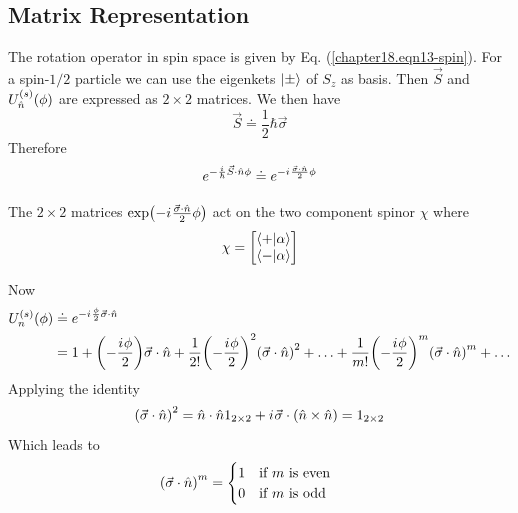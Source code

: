 \subsection{Matrix Representation}
The rotation operator in spin space is given by Eq. (\ref{chapter18.eqn13-spin}). For a spin-$1/2$ particle we can use the eigenkets $\ket{\pm}$ of $S_z$ as basis. Then $\vec{S}$ and $U^{(s)}_{\hat{n}}\qty(\phi)$ are expressed as $2\times 2$ matrices. We then have
\begin{equation}
\vec{S} \doteq \frac{1}{2} \hbar \vec{\sigma}
\end{equation}
Therefore
\begin{equation}
e^{-\frac{{i\mkern1mu}}{\hbar} \vec{S}\cdot \hat{n} \phi} \doteq e^{-{i\mkern1mu} \frac{\vec{\sigma}\cdot \hat{n}}{2} \phi}
\end{equation}

The $2\times 2$ matrices $\exp(-{i\mkern1mu} \frac{\vec{\sigma}\cdot \hat{n}}{2} \phi)$ act on the two component spinor $\chi$ where
\begin{equation}
\chi = \mqty[\braket{+}{\alpha} \\ \braket{-}{\alpha}]
\end{equation}

Now
\begin{align*}
U_n^{(s)}\qty(\phi) 
&\doteq e^{-{i\mkern1mu} \frac{\phi}{2} \vec{\sigma}\cdot\hat{n}} \\
&= 1 + \qty(-\frac{{i\mkern1mu}\phi}{2}) \vec{\sigma}\cdot\hat{n} 
+ \frac{1}{2 !} \qty(-\frac{{i\mkern1mu}\phi}{2})^2 \qty(\vec{\sigma}\cdot\hat{n})^2 + \ldots 
+ \frac{1}{m !} \qty(-\frac{{i\mkern1mu}\phi}{2})^m \qty(\vec{\sigma}\cdot\hat{n})^m + \ldots
\end{align*}
Applying the identity
\begin{equation}
\qty(\vec{\sigma}\cdot\hat{n})^2 = \hat{n}\cdot\hat{n} 1_{2\times 2} + {i\mkern1mu} \vec{\sigma} \cdot \qty(\hat{n} \times \hat{n}) = 1_{2\times 2}
\end{equation}
Which leads to
\begin{equation}
\qty(\vec{\sigma}\cdot\hat{n})^m = 
\begin{cases}
1 \qq{if $m$ is even}\\
0 \qq{if $m$ is odd}
\end{cases}
\end{equation}

